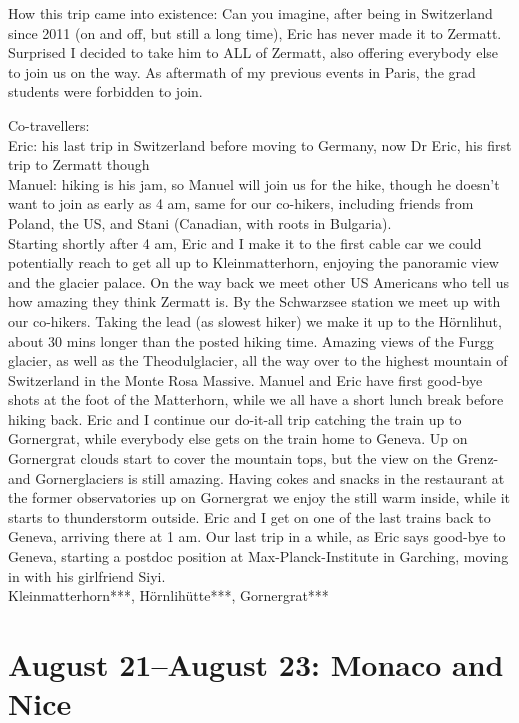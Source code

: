 How this trip came into existence: Can you imagine, after being in Switzerland since 2011 (on and off, but still a long time), Eric has never made it to Zermatt. Surprised I decided to take him to ALL of Zermatt, also offering everybody else to join us on the way. As aftermath of my previous events in Paris, the grad students were forbidden to join.

Co-travellers:\\
Eric: his last trip in Switzerland before moving to Germany, now Dr Eric, his first trip to Zermatt though\\

Manuel: hiking is his jam, so Manuel will join us for the hike, though he doesn't want to join as early as 4 am, same for our co-hikers, including friends from Poland, the US, and Stani (Canadian, with roots in Bulgaria).\\

Starting shortly after 4 am, Eric and I make it to the first cable car we could potentially reach to get all up to Kleinmatterhorn, enjoying the panoramic view and the glacier palace. On the way back we meet other US Americans who tell us how amazing they think Zermatt is. By the Schwarzsee station we meet up with our co-hikers. Taking the lead (as slowest hiker) we make it up to the H\"ornlihut, about 30 mins longer than the posted hiking time. Amazing views of the Furgg glacier, as well as the Theodulglacier, all the way over to the highest mountain of Switzerland in the Monte Rosa Massive. Manuel and Eric have first good-bye shots at the foot of the Matterhorn, while we all have a short lunch break before hiking back. Eric and I continue our do-it-all trip catching the train up to Gornergrat, while everybody else gets on the train home to Geneva. Up on Gornergrat clouds start to cover the mountain tops, but the view on the Grenz- and Gornerglaciers is still amazing. Having cokes and snacks in the restaurant at the former observatories up on Gornergrat we enjoy the still warm inside, while it starts to thunderstorm outside. Eric and I get on one of the last trains back to Geneva, arriving there at 1 am. Our last trip in a while, as Eric says good-bye to Geneva, starting a postdoc position at Max-Planck-Institute in Garching, moving in with his girlfriend Siyi.\\

Kleinmatterhorn***, H\"ornlih\"utte***, Gornergrat***

\section{August 21--August 23: Monaco and Nice}
\label{2015:Monaco}

